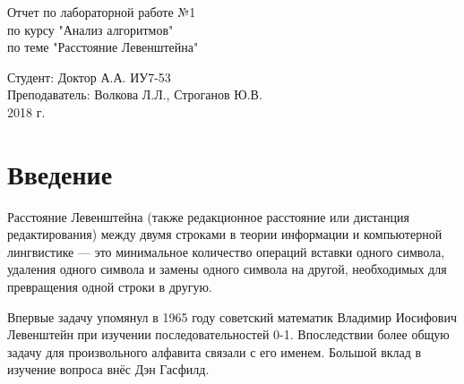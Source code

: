 \documentclass[a4paper, 14pt]{article}
\begin{document}
	\begin{titlepage}
		\begin{center}
			\begin{LARGE}
				Отчет по лабораторной работе №1\\
					по курсу "Анализ алгоритмов"\\
					по теме "Расстояние Левенштейна"
			\end{LARGE}
		
			\begin{Large}
				\vspace{10cm}
				Студент: Доктор А.А. ИУ7-53\\
					Преподаватель: Волкова Л.Л.,
								   Строганов Ю.В.\\
				
				\vspace{7cm}2018 г.				   
			\end{Large}
			
		\end{center}
		 
	\end{titlepage}

\tableofcontents
	
\newpage
\section*{Введение}

\hspace{1cm}Расстояние Левенштейна (также редакционное расстояние или дистанция редактирования) между двумя строками в теории информации и компьютерной лингвистике — это минимальное количество операций вставки одного символа, удаления одного символа и замены одного символа на другой, необходимых для превращения одной строки в другую\cite{lev_1}.

\hspace{1cm}Впервые задачу упомянул в 1965 году советский математик Владимир Иосифович Левенштейн при изучении последовательностей 0-1. Впоследствии более общую задачу для произвольного алфавита связали с его именем. Большой вклад в изучение вопроса внёс Дэн Гасфилд.
\end{document}
